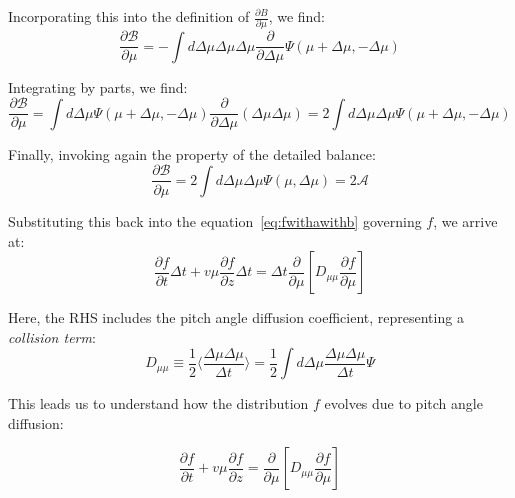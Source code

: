 
Incorporating this into the definition of $\frac{\partial B}{\partial \mu}$, we find:
%
\begin{equation}
\frac{\partial \mathcal B}{\partial \mu} = - \int d\Delta\mu \Delta\mu\Delta\mu \frac{\partial}{\partial \Delta\mu} \Psi(\mu+\Delta\mu, -\Delta\mu)
\end{equation}

Integrating by parts, we find:
%
\begin{equation}
\frac{\partial \mathcal B}{\partial \mu} = \int d\Delta\mu \Psi(\mu+\Delta\mu, -\Delta\mu) \frac{\partial}{\partial \Delta \mu} (\Delta\mu\Delta\mu) =  2 \int d\Delta\mu \Delta\mu \Psi(\mu+\Delta\mu, -\Delta\mu)
\end{equation}

Finally, invoking again the property of the detailed balance: 
%
\begin{equation}
\frac{\partial \mathcal B}{\partial \mu} = 2 \int d\Delta\mu \Delta\mu \Psi(\mu, \Delta\mu) = 2 \mathcal A
\end{equation}

Substituting this back into the equation~\ref{eq:fwithawithb} governing \( f \), we arrive at:
%
\begin{equation}
\frac{\partial f}{\partial t} \Delta t  +  v \mu \frac{\partial f}{\partial z} \Delta t = 
\Delta t \frac{\partial}{\partial\mu} \left[D_{\mu\mu}\frac{\partial f}{\partial\mu}\right]
\end{equation}

Here, the RHS includes the pitch angle diffusion coefficient, representing a \emph{collision term}:
%
\begin{equation}
D_{\mu\mu} \equiv \frac{1}{2}\langle \frac{\Delta\mu\Delta\mu}{\Delta t}\rangle = \frac{1}{2} \int d \Delta\mu \frac{\Delta\mu\Delta\mu}{\Delta t} \Psi
\end{equation}

This leads us to understand how the distribution \( f \) evolves due to pitch angle diffusion:
%
\begin{remark}
\begin{equation}\label{eq:fdiffmu}
\frac{\partial f}{\partial t} +v\mu \frac{\partial f}{\partial z} = \frac{\partial}{\partial\mu}\left[D_{\mu\mu}\frac{\partial f}{\partial\mu}  \right]
\end{equation}
\end{remark}

